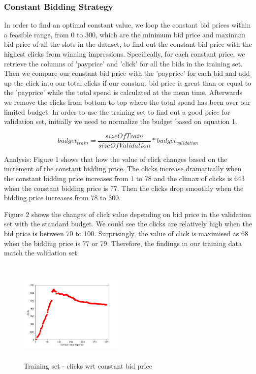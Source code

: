 \documentclass{sig-alternate-05-2015}
\begin{document}
\subsubsection{Constant Bidding Strategy}
In order to find an optimal constant value, we loop the constant bid prices within a feasible range, from 0 to 300, which are the minimum bid price and maximum bid price of all the slots in the dataset, to find out the constant bid price with the highest clicks from winning impressions. 
Specifically, for each constant price, we retrieve the columns of 'payprice' and 'click' for all the bids in the training set. Then we compare our constant bid price with the 'payprice' for each bid and add up the click into our total clicks if our constant bid price is great than or equal to the 'payprice' while the total spend is calculated at the mean time. Afterwards we remove the clicks from bottom to top where the total spend has been over our limited budget.
In order to use the training set to find out a good price for validation set, initially we need to normalize the budget based on equation 1.

\begin{equation}budget_{train}=\frac{sizeOfTrain}{sizeOfValidation} * budget_{validation}\end{equation}

Analysis: 
Figure 1 shows that how the value of click changes based on the increment of the constant bidding price. The clicks increase dramatically when the constant bidding price increases from 1 to 78 and the climax of clicks is 643 when the constant bidding price is 77. Then the clicks drop smoothly when the bidding price increases from 78 to 300.


Figure 2 shows the changes of click value depending on bid price in the validation set with the standard budget. We could see the clicks are relatively high when the bid price is between 70 to 100. Surprisingly, the value of click is maximised as 68 when the bidding price is 77 or 79. Therefore, the findings in our training data match the validation set.

\begin{figure}
\centering
\includegraphics[height=2in, width=2in]{images/constant_bidding.png}
\caption{Training set - clicks wrt constant bid price}
\end{figure}
\end{document}
